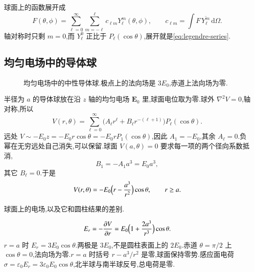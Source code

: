 球面上的函数展开成
\begin{equation}
  F(\theta,\phi)
  =\sum_{\ell=0}^{\infty}\sum_{m=-\ell}^{\ell}
    c_{\ell m} Y_{\ell}^{m}(\theta,\phi),
  \qquad
  c_{\ell m}=\int F\,\overline{Y_{\ell}^{m}}\,\mathrm{d}\Omega.
\end{equation}
轴对称时只剩 $m=0$,而 $Y_{\ell}^{0}$ 正比于 $P_{\ell}(\cos\theta)$,展开就是\eqref{eq:legendre-series}.

\subsection{均匀电场中的导体球}

\begin{figure}[htb]
  \centering
  
  \caption{均匀电场中的中性导体球.极点上的法向场是 $3E_0$,赤道上法向场为零.}
  \label{fig:sphere-field}
\end{figure}

半径为 $a$ 的导体球放在沿 $z$ 轴的均匀电场 $\mathbf{E}_0$ 里,球面电位取为零.球外 $\nabla^2 V=0$,轴对称,所以
\begin{equation}
  V(r,\theta)
  =\sum_{\ell=0}^{\infty}
    \bigl(A_{\ell} r^{\ell}+B_{\ell} r^{-(\ell+1)}\bigr) P_{\ell}(\cos\theta).
\end{equation}
远处 $V\sim -E_0 z=-E_0 r\cos\theta=-E_0 r P_1(\cos\theta)$,因此 $A_1=-E_0$,其余 $A_{\ell}=0$.负幂在无穷远处自己消失,可以保留.球面 $V(a,\theta)=0$ 要求每一项的两个径向系数抵消,
\begin{equation}
  B_1=-A_1 a^{3}=E_0 a^{3},
\end{equation}
其它 $B_{\ell}=0$.于是
\begin{equation}
  V(r,\theta)
  =-E_0\Bigl(r-\frac{a^3}{r^2}\Bigr)\cos\theta,
  \qquad r\geq a.
  \label{eq:sphere-potential}
\end{equation}

\begin{example}
球面上的电场,以及它和圆柱结果的差别.
\end{example}
\begin{solution}
\begin{equation}
  E_r=-\frac{\partial V}{\partial r}
  =E_0\Bigl(1+\frac{2a^3}{r^3}\Bigr)\cos\theta.
\end{equation}
$r=a$ 时 $E_r=3E_0\cos\theta$.两极是 $3E_0$,不是圆柱表面上的 $2E_0$.赤道 $\theta=\pi/2$ 上 $\cos\theta=0$,法向场为零.$r=a$ 时括号 $r-a^3/r^2$ 是零,球面保持零势.感应面电荷 $\sigma=\varepsilon_0 E_r=3\varepsilon_0 E_0\cos\theta$,北半球与南半球反号,总电荷是零.
\end{solution}

